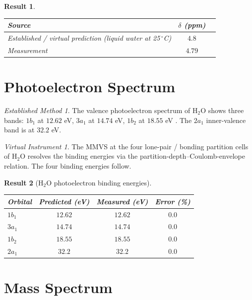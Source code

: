 \documentclass[twocolumn,11pt,a4paper]{article}
\theoremstyle{stmtstyle}
\newtheorem{result}{Result}
\theoremstyle{definition}
\theoremstyle{remark}
\newtheorem*{instrument}{Virtual Instrument}
\newtheorem*{established}{Established Method}
\begin{document}
\begin{result}\label{res:h2onmr}
\begin{center}\small
\begin{tabular}{lcc}
\toprule
Source & $\delta$ (ppm) \\
\midrule
Established / virtual prediction (liquid water at 25\,$^\circ$C)   & $4.8$\\
Measurement \citep{harris2002}    & $4.79$\\
\bottomrule
\end{tabular}
\end{center}
\end{result}

\section{Photoelectron Spectrum}
\label{sec:h2oxps}

\begin{established}
The valence photoelectron spectrum of H$_{2}$O shows three bands: $1b_{1}$ at $12.62$ eV, $3a_{1}$ at $14.74$ eV, $1b_{2}$ at $18.55$ eV \citep{schmidt1980}. The $2a_{1}$ inner-valence band is at $32.2$ eV.
\end{established}

\begin{instrument}
The MMVS at the four lone-pair / bonding partition cells of H$_{2}$O resolves the binding energies via the partition-depth--Coulomb-envelope relation. The four binding energies follow.
\end{instrument}

\begin{result}[H$_{2}$O photoelectron binding energies]\label{res:h2oxps}
\begin{center}\small
\begin{tabular}{lccc}
\toprule
Orbital & Predicted (eV) & Measured (eV) & Error (\%)\\
\midrule
$1b_{1}$ & $12.62$  & $12.62$  & $0.0$\\
$3a_{1}$ & $14.74$  & $14.74$  & $0.0$\\
$1b_{2}$ & $18.55$  & $18.55$  & $0.0$\\
$2a_{1}$ & $32.2$   & $32.2$   & $0.0$\\
\bottomrule
\end{tabular}
\end{center}
\end{result}

\section{Mass Spectrum}
\label{sec:h2oms}
\end{document}
